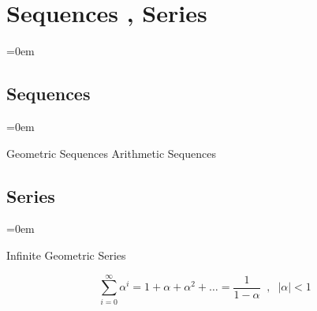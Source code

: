 


\makeatletter
\newcommand*{\harpoon}{\mathpalette{\overarrow@\rightharpoonupfill@}}
\newcommand*{\rightharpoonupfill@}{\arrowfill@\relbar\relbar\rightharpoonup}
\makeatother




%









\section{Sequences , Series}
\label{sec:sequences_series}
\parindent=0em

\subsection{Sequences}
\label{ssec:sequences}
\parindent=0em

Geometric Sequences
Arithmetic Sequences

\subsectionend
\subsection{Series}
\label{ssec:series}
\parindent=0em

Infinite Geometric Series

\[
	\sum^{\infty}_{i=0} { {\alpha}^{i}} = 1 + {\alpha} + {\alpha}^2 + \ldots = \frac{1}{1-\alpha}  \;\; , \;\;|\alpha| < 1
\]


\subsectionend

\sectionend



%


